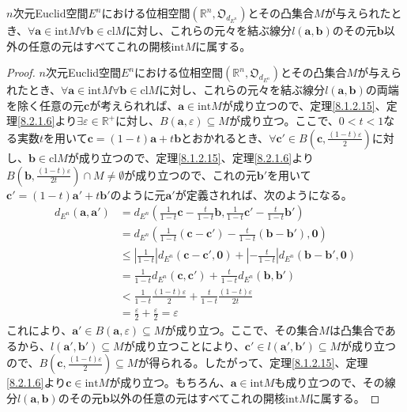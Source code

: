\documentclass[dvipdfmx]{jsarticle}
\begin{document}
\begin{thm}\label{8.2.2.30}
$n$次元Euclid空間$E^{n}$における位相空間$\left( \mathbb{R}^{n},\mathfrak{O}_{d_{E^{n}}} \right)$とその凸集合$M$が与えられたとき、$\forall\mathbf{a} \in {\mathrm{int}}M\forall\mathbf{b} \in {\mathrm{cl}}M$に対し、これらの元々を結ぶ線分$l\left( \mathbf{a},\mathbf{b} \right)$のその元$\mathbf{b}$以外の任意の元はすべてこれの開核${\mathrm{int}}M$に属する。
\end{thm}
\begin{proof}
$n$次元Euclid空間$E^{n}$における位相空間$\left( \mathbb{R}^{n},\mathfrak{O}_{d_{E^{n}}} \right)$とその凸集合$M$が与えられたとき、$\forall\mathbf{a} \in {\mathrm{int}}M\forall\mathbf{b} \in {\mathrm{cl}}M$に対し、これらの元々を結ぶ線分$l\left( \mathbf{a},\mathbf{b} \right)$の両端を除く任意の元$\mathbf{c}$が考えられれば、$\mathbf{a} \in {\mathrm{int}}M$が成り立つので、定理\ref{8.1.2.15}、定理\ref{8.2.1.6}より$\exists\varepsilon \in \mathbb{R}^{+}$に対し、$B\left( \mathbf{a},\varepsilon \right) \subseteq M$が成り立つ。ここで、$0 < t < 1$なる実数$t$を用いて$\mathbf{c} = (1 - t)\mathbf{a} + t\mathbf{b}$とおかれるとき、$\forall\mathbf{c}' \in B\left( \mathbf{c},\frac{(1 - t)\varepsilon}{2} \right)$に対し、$\mathbf{b} \in {\mathrm{cl}}M$が成り立つので、定理\ref{8.1.2.15}、定理\ref{8.2.1.6}より$B\left( \mathbf{b},\frac{(1 - t)\varepsilon}{2t} \right) \cap M \neq \emptyset$が成り立つので、これの元$\mathbf{b}'$を用いて$\mathbf{c}' = (1 - t)\mathbf{a}' + t\mathbf{b}'$のように元$\mathbf{a}'$が定義されれば、次のようになる。
\begin{align*}
d_{E^{n}}\left( \mathbf{a},\mathbf{a}' \right) &= d_{E^{n}}\left( \frac{1}{1 - t}\mathbf{c} - \frac{t}{1 - t}\mathbf{b},\frac{1}{1 - t}\mathbf{c}' - \frac{t}{1 - t}\mathbf{b}' \right)\\
&= d_{E^{n}}\left( \frac{1}{1 - t}\left( \mathbf{c} - \mathbf{c}' \right) - \frac{t}{1 - t}\left( \mathbf{b} - \mathbf{b}' \right),\mathbf{0} \right)\\
&\leq \left| \frac{1}{1 - t} \right|d_{E^{n}}\left( \mathbf{c} - \mathbf{c}',\mathbf{0} \right) + \left| - \frac{t}{1 - t} \right|d_{E^{n}}\left( \mathbf{b} - \mathbf{b}',\mathbf{0} \right)\\
&= \frac{1}{1 - t}d_{E^{n}}\left( \mathbf{c},\mathbf{c}' \right) + \frac{t}{1 - t}d_{E^{n}}\left( \mathbf{b},\mathbf{b}' \right)\\
&< \frac{1}{1 - t}\frac{(1 - t)\varepsilon}{2} + \frac{t}{1 - t}\frac{(1 - t)\varepsilon}{2t}\\
&= \frac{\varepsilon}{2} + \frac{\varepsilon}{2} = \varepsilon
\end{align*}
これにより、$\mathbf{a}' \in B\left( \mathbf{a},\varepsilon \right) \subseteq M$が成り立つ。ここで、その集合$M$は凸集合であるから、$l\left( \mathbf{a}',\mathbf{b}' \right) \subseteq M$が成り立つことにより、$\mathbf{c}' \in l\left( \mathbf{a}',\mathbf{b}' \right) \subseteq M$が成り立つので、$B\left( \mathbf{c},\frac{(1 - t)\varepsilon}{2} \right) \subseteq M$が得られる。したがって、定理\ref{8.1.2.15}、定理\ref{8.2.1.6}より$\mathbf{c} \in {\mathrm{int}}M$が成り立つ。もちろん、$\mathbf{a} \in {\mathrm{int}}M$も成り立つので、その線分$l\left( \mathbf{a},\mathbf{b} \right)$のその元$\mathbf{b}$以外の任意の元はすべてこれの開核${\mathrm{int}}M$に属する。
\end{proof}
\end{document}
